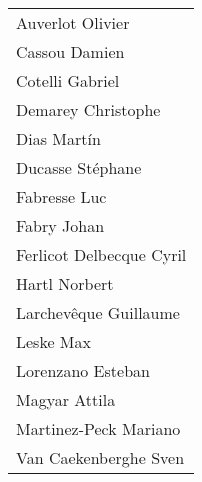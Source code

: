 \documentclass[10pt,twoside,showtrims]{support/latex/sbabook}
\begin{document}
\begin{tabular}{l}
Auverlot Olivier\\
Cassou Damien\\
Cotelli Gabriel\\
Demarey Christophe\\
Dias Martín\\
Ducasse Stéphane\\
Fabresse Luc\\
Fabry Johan\\
Ferlicot Delbecque Cyril\\
Hartl Norbert\\
Larchevêque Guillaume\\
Leske Max\\
Lorenzano Esteban\\
Magyar Attila\\
Martinez-Peck Mariano\\
Van Caekenberghe Sven\\
\end{tabular}
\end{document}
